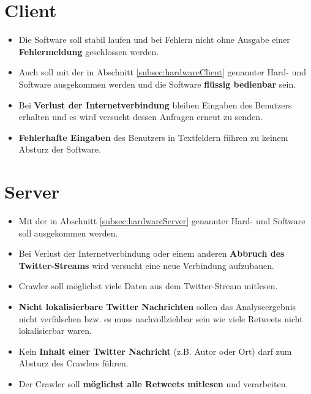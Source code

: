 
\section{Client}
\begin{itemize}
	\item Die Software soll stabil laufen und bei Fehlern nicht ohne Ausgabe einer \textbf{Fehlermeldung} geschlossen werden.
	\item Auch soll mit der in Abschnitt \ref{subsec:hardwareClient} genannter Hard- und Software ausgekommen werden und die Software \textbf{flüssig bedienbar} sein.
	\item Bei \textbf{Verlust der Internetverbindung} bleiben Eingaben des Benutzers erhalten und es wird versucht dessen Anfragen erneut zu senden.
	\item \textbf{Fehlerhafte Eingaben} des Benutzers in Textfeldern führen zu keinem Absturz der Software.
\end{itemize}
\section{Server}
\begin{itemize}
	\item Mit der in Abschnitt \ref{subsec:hardwareServer} genannter Hard- und Software soll ausgekommen werden.
	\item Bei Verlust der Internetverbindung oder einem anderen \textbf{Abbruch des Twitter-Streams} wird versucht eine neue Verbindung aufzubauen.
	\item Crawler soll möglichst viele Daten aus dem Twitter-Stream mitlesen.
	\item \textbf{Nicht lokalisierbare Twitter Nachrichten} sollen das Analyseergebnis nicht verfälschen bzw. es muss nachvollziehbar sein wie viele Retweets nicht lokalisierbar waren.
	\item Kein \textbf{Inhalt einer Twitter Nachricht} (z.B. Autor oder Ort) darf zum Absturz des Crawlers führen.
	\item Der Crawler soll \textbf{möglichst alle Retweets mitlesen} und verarbeiten.
\end{itemize}
